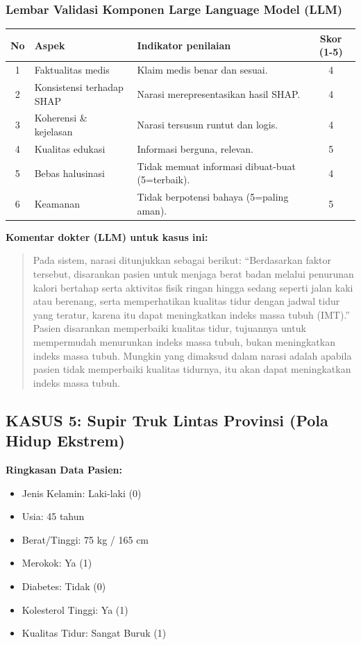 \subsubsection*{Lembar Validasi Komponen Large Language Model (LLM)}
\begin{center}
\begin{tabular}{|c|p{3.5cm}|p{7.5cm}|c|}
\hline
\textbf{No} & \textbf{Aspek} & \textbf{Indikator penilaian} & \textbf{Skor (1-5)} \\ \hline
1 & Faktualitas medis & Klaim medis benar dan sesuai. & 4 \\ \hline
2 & Konsistensi terhadap SHAP & Narasi merepresentasikan hasil SHAP. & 4 \\ \hline
3 & Koherensi \& kejelasan & Narasi tersusun runtut dan logis. & 4 \\ \hline
4 & Kualitas edukasi & Informasi berguna, relevan. & 5 \\ \hline
5 & Bebas halusinasi & Tidak memuat informasi dibuat-buat (5=terbaik). & 4 \\ \hline
6 & Keamanan & Tidak berpotensi bahaya (5=paling aman). & 5 \\ \hline
\end{tabular}
\end{center}

\textbf{Komentar dokter (LLM) untuk kasus ini:}
\begin{quote}
Pada sistem, narasi ditunjukkan sebagai berikut: ``Berdasarkan faktor tersebut, disarankan pasien untuk menjaga berat badan melalui penurunan kalori bertahap serta aktivitas fisik ringan hingga sedang seperti jalan kaki atau berenang, serta memperhatikan kualitas tidur dengan jadwal tidur yang teratur, karena itu dapat meningkatkan indeks massa tubuh (IMT).''
Pasien disarankan memperbaiki kualitas tidur, tujuannya untuk mempermudah menurunkan indeks massa tubuh, bukan meningkatkan indeks massa tubuh.
Mungkin yang dimaksud dalam narasi adalah apabila pasien tidak memperbaiki kualitas tidurnya, itu akan dapat meningkatkan indeks massa tubuh.
\end{quote}

\vspace{1.5cm}

\subsection*{KASUS 5: Supir Truk Lintas Provinsi (Pola Hidup Ekstrem)}
\textbf{Ringkasan Data Pasien:}
\begin{itemize}
    \item Jenis Kelamin: Laki-laki (0)
    \item Usia: 45 tahun
    \item Berat/Tinggi: 75 kg / 165 cm
    \item Merokok: Ya (1)
    \item Diabetes: Tidak (0)
    \item Kolesterol Tinggi: Ya (1)
    \item Kualitas Tidur: Sangat Buruk (1)
\end{itemize}

